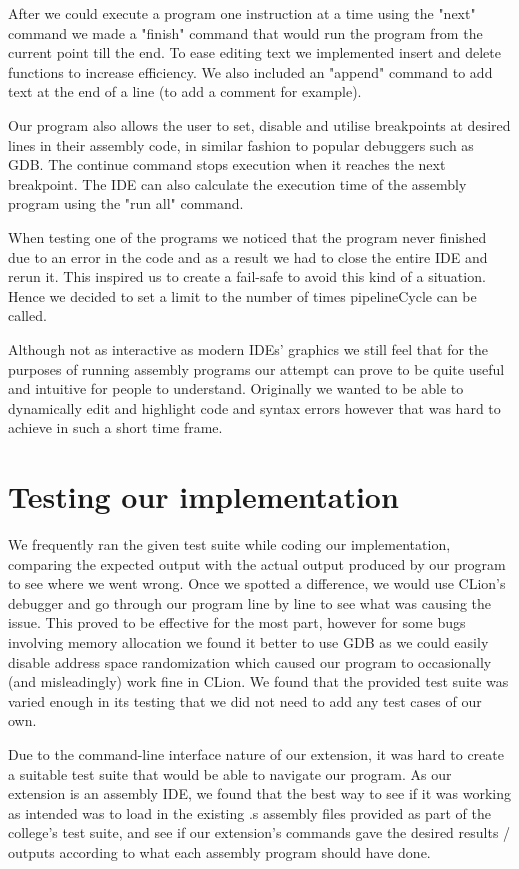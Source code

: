 \documentclass[11pt]{article}
\begin{document}
After we could execute a program one instruction at a time using the "next" command we made a "finish" command that would run the program from the current point till the end. To ease editing text we implemented insert and delete functions to increase efficiency. We also included an "append" command to add text at the end of a line (to add a comment for example).

Our program also allows the user to set, disable and utilise breakpoints at desired lines in their assembly code, in similar fashion to popular debuggers such as GDB. The continue command stops execution when it reaches the next breakpoint. The IDE can also calculate the execution time of the assembly program using the "run all" command.

When testing one of the programs we noticed that the program never finished due to an error in the code and as a result we had to close the entire IDE and rerun it. This inspired us to create a fail-safe to avoid this kind of a situation. Hence we decided to set a limit to the number of times pipelineCycle can be called.

Although not as interactive as modern IDEs' graphics we still feel that for the purposes of running assembly programs our attempt can prove to be quite useful and intuitive for people to understand.
Originally we wanted to be able to dynamically edit and highlight code and syntax errors however that was hard to achieve in such a short time frame.


\section*{Testing our implementation}
We frequently ran the given test suite while coding our implementation, comparing the expected output with the actual output produced by our program to see where we went wrong. Once we spotted a difference, we would use CLion's debugger and go through our program line by line to see what was causing the issue. This proved to be effective for the most part, however for some bugs involving memory allocation we found it better to use GDB as we could easily disable address space randomization which caused our program to occasionally (and misleadingly) work fine in CLion. We found that the provided test suite was varied enough in its testing that we did not need to add any test cases of our own.

Due to the command-line interface nature of our extension, it was hard to create a suitable test suite that would be able to navigate our program. As our extension is an assembly IDE, we found that the best way to see if it was working as intended was to load in the existing .s assembly files provided as part of the college's test suite, and see if our extension's commands gave the desired results / outputs according to what each assembly program should have done.
\end{document}
